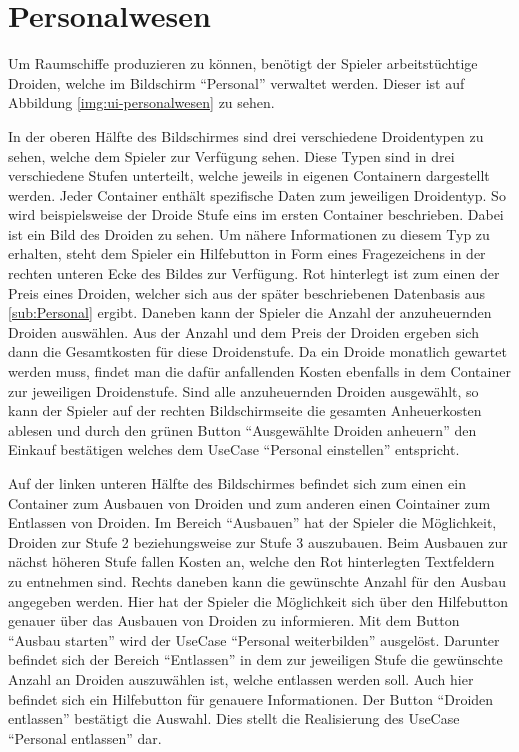\section{Personalwesen}
\label{sec:ui-personalwesen}


Um Raumschiffe produzieren zu können, benötigt der Spieler arbeitstüchtige Droiden, welche im Bildschirm “Personal” verwaltet werden. Dieser ist auf Abbildung \vref{img:ui-personalwesen} zu sehen.

In der oberen Hälfte des Bildschirmes sind drei verschiedene Droidentypen zu sehen, welche dem Spieler zur Verfügung sehen. Diese Typen sind in drei verschiedene Stufen unterteilt, welche jeweils in eigenen Containern dargestellt werden. Jeder Container enthält spezifische Daten zum jeweiligen Droidentyp. So wird beispielsweise der Droide Stufe eins im ersten Container beschrieben. Dabei ist ein Bild des Droiden zu sehen. Um nähere Informationen zu diesem Typ zu erhalten, steht dem Spieler ein Hilfebutton in Form eines Fragezeichens in der rechten unteren Ecke des Bildes zur Verfügung. Rot hinterlegt ist zum einen der Preis eines Droiden, welcher sich aus der später beschriebenen Datenbasis aus \vref{sub:Personal} ergibt. Daneben kann der Spieler die Anzahl der anzuheuernden Droiden auswählen. Aus der Anzahl und dem Preis der Droiden ergeben sich dann die Gesamtkosten für diese Droidenstufe. Da ein Droide monatlich gewartet werden muss, findet man die dafür anfallenden Kosten ebenfalls in dem Container zur jeweiligen Droidenstufe. Sind alle anzuheuernden Droiden ausgewählt, so kann der Spieler auf der rechten Bildschirmseite die gesamten Anheuerkosten ablesen und durch den grünen Button “Ausgewählte Droiden anheuern” den Einkauf bestätigen welches dem UseCase “Personal einstellen” entspricht.

Auf der linken unteren Hälfte des Bildschirmes befindet sich zum einen ein Container zum Ausbauen von Droiden und zum anderen einen Cointainer zum Entlassen von Droiden. Im Bereich “Ausbauen” hat der Spieler die Möglichkeit, Droiden zur Stufe 2 beziehungsweise zur Stufe 3 auszubauen. Beim Ausbauen zur nächst höheren Stufe fallen Kosten an, welche den Rot hinterlegten Textfeldern zu entnehmen sind. Rechts daneben kann die gewünschte Anzahl für den Ausbau angegeben werden. Hier hat der Spieler die Möglichkeit sich über den Hilfebutton genauer über das Ausbauen von Droiden zu informieren. Mit dem Button “Ausbau starten” wird der UseCase “Personal weiterbilden” ausgelöst. Darunter befindet sich der Bereich “Entlassen” in dem zur jeweiligen Stufe die gewünschte Anzahl an Droiden auszuwählen ist, welche entlassen werden soll. Auch hier befindet sich ein Hilfebutton für genauere Informationen. Der Button “Droiden entlassen” bestätigt die Auswahl. Dies stellt die Realisierung des UseCase “Personal entlassen” dar. 

